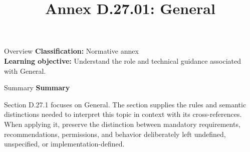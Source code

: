 \documentclass[10pt,letterpaper]{article}
\title{Annex D.27.01: General}
\author{}
\date{}
\begin{document}
\maketitle
\begin{CornellOverviewBox}{Overview}
\textbf{Classification:} Normative annex\\[2pt]
\textbf{Learning objective:} Understand the role and technical guidance associated with General.
\end{CornellOverviewBox}\begin{CornellSummaryBox}{Summary}
{\sffamily\bfseries\color{Accent} Summary}\par\vspace{3pt}Section D.27.1 focuses on General. The section supplies the rules and semantic distinctions needed to interpret this topic in context with its cross-references. When applying it, preserve the distinction between mandatory requirements, recommendations, permissions, and behavior deliberately left undefined, unspecified, or implementation-defined.
\end{CornellSummaryBox}
\end{document}
